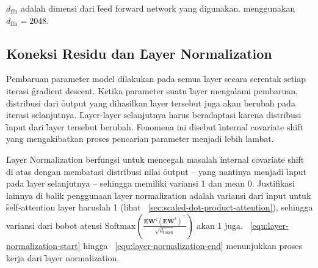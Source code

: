 	$d_{\text{ffn}}$ adalah dimensi dari \f{feed forward network} yang digunakan. \cite{transformerori} menggunakan $d_{\text{ffn}} = 2048$.

	\subsection{Koneksi Residu dan \f{Layer Normalization}}
	\label{sec:layer-normalization}

	Pembaruan parameter model dilakukan pada semua \f{layer} secara serentak setiap iterasi \f{gradient descent}. Ketika parameter suatu \f{layer} mengalami pembaruan, distribusi dari \f{output} yang dihasilkan \f{layer} tersebut juga akan berubah pada iterasi selanjutnya. \f{Layer-layer} selanjutnya harus beradaptasi karena distribusi \f{input} dari \f{layer} tersebut berubah. Fenomena ini disebut \f{internal covariate shift} yang mengakibatkan proses pencarian parameter menjadi lebih lambat.
	
	\f{Layer Normalization} berfungsi untuk mencegah masalah \f{internal covariate shift} di atas dengan membatasi distribusi nilai \f{output} -- yang nantinya menjadi \f{input} pada \f{layer} selanjutnya -- sehingga memiliki variansi 1 dan mean 0. Justifikasi lainnya di balik penggunaan \f{layer normalization} adalah variansi dari \f{input} untuk \f{self-attention layer} haruslah 1 (lihat \sect~\ref{sec:scaled-dot-product-attention}), sehingga variansi dari bobot atensi $\text{Softmax}(\frac{\mathbf{EW}^q (\mathbf{EW}^k)^{\top}}{\sqrt{d_{\text{token}}}})$ akan 1 juga. \equ~\ref{equ:layer-normalization-start} hingga \equ~\ref{equ:layer-normalization-end} menunjukkan proses kerja dari \f{layer normalization}.


